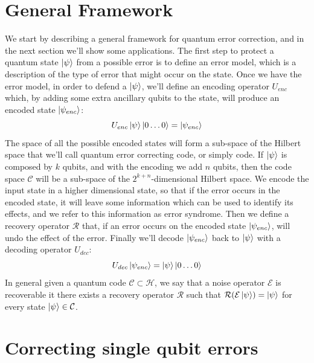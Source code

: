 \documentclass{article}
\begin{document}
	\section{General Framework}
	We start by describing a general framework for quantum error correction, and in the next section we'll show some applications. The first step to protect a quantum state $\ket{\psi}$ from a possible error is to define an error model, which is a description of the type of error that might occur on the state. Once we have the error model, in order to defend a $\ket{\psi}$, we'll define an encoding operator $U_{enc}$ which, by adding some extra ancillary qubits to the state, will produce an encoded state $\ket{\psi_{enc}}$:
	\[ U_{enc}\ket{\psi}\ket{0\dots0} = \ket{\psi_{enc}} \]
	The space of all the possible encoded states will form a sub-space of the Hilbert space that we'll call quantum error correcting code, or simply code. If $\ket{\psi}$ is composed by $k$ qubits, and with the encoding we add $n$ qubits, then the code space $\mathcal{C}$ will be a sub-space of the $2^{k+n}$-dimensional Hilbert space. We encode the input state in a higher dimensional state, so that if the error occurs in the encoded state, it will leave some information which can be used to identify its effects, and we refer to this information as error syndrome. Then we define a recovery operator $\mathcal{R}$ that, if an error occurs on the encoded state $\ket{\psi_{enc}}$, will undo the effect of the error. Finally we'll decode $\ket{\psi_{enc}}$ back to $\ket{\psi}$ with a decoding operator $U_{dec}$:
	\[U_{dec}\ket{\psi_{enc}} = \ket{\psi}\ket{0\dots0}\]
	In general given a quantum code $\mathcal{C} \subset \mathcal{H}$, we say that a noise operator $\mathcal{E}$ is recoverable it there exists a recovery operator $\mathcal{R}$ such that $\mathcal{R(\mathcal{E}\ket{\psi})} = \ket{\psi}$ for every state $\ket{\psi} \in \mathcal{C}$.
	\section{Correcting single qubit errors}
\end{document}
